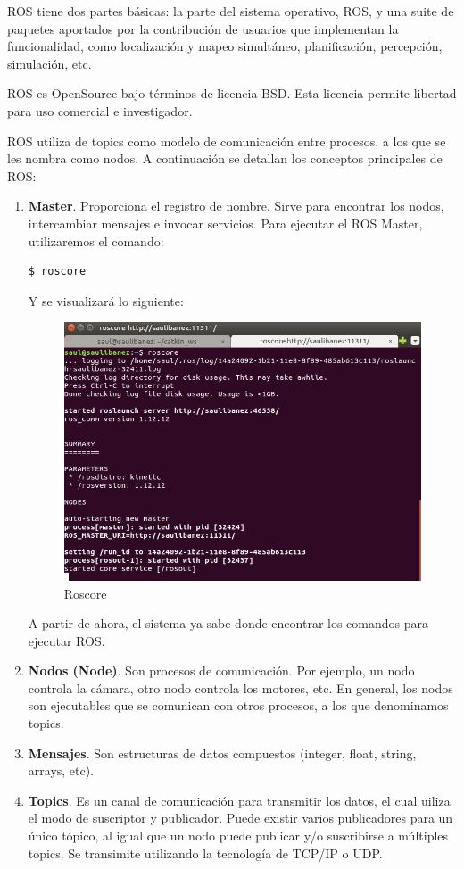ROS tiene dos partes básicas: la parte del sistema operativo, ROS, y una suite de paquetes aportados por la contribución de usuarios que implementan la funcionalidad, como localización y mapeo simultáneo, planificación, percepción, simulación, etc.

ROS es OpenSource bajo términos de licencia BSD. Esta licencia permite libertad para uso comercial e investigador.

ROS utiliza de topics como modelo de comunicación entre procesos, a los que se les nombra como nodos. A continuación se detallan los conceptos principales de ROS:
\begin{enumerate}
 \item \textbf{Master}. Proporciona el registro de nombre. Sirve para encontrar los nodos, intercambiar mensajes e invocar servicios. 
 Para ejecutar el ROS Master, utilizaremos el comando:
  \renewcommand{\lstlistingname}{}
  \begin{lstlisting}[caption=roscore, label={lst:roscore}]
    $ roscore
  \end{lstlisting}
  
  Y se visualizará lo siguiente:
  
  \begin{figure} [hbtp]
  \begin{center}
    \includegraphics[width=12cm]{img/cap1/roscore}
  \end{center}
  \caption{Roscore}
  \label{fig:roscore}
  \end{figure}
  
  A partir de ahora, el sistema ya sabe donde encontrar los comandos para ejecutar ROS.
  \item \textbf{Nodos (Node)}. Son procesos de comunicación. Por ejemplo, un nodo controla la cámara, otro nodo controla los motores, etc. En general, los nodos son ejecutables que se comunican con otros procesos, a los que denominamos topics.
  \item \textbf{Mensajes}. Son estructuras de datos compuestos (integer, float, string, arrays, etc).
  \item \textbf{Topics}. Es un canal de comunicación para transmitir los datos, el cual uiliza el modo de suscriptor y publicador. Puede existir varios publicadores para un único tópico, al igual que un nodo puede publicar y/o suscribirse a múltiples topics.
  Se transimite utilizando la tecnología de TCP/IP o UDP.
\end{enumerate}


